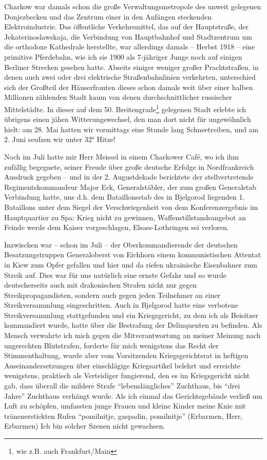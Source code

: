 Charkow war damals schon die große Verwaltungsmetropole des unweit gelegenen Donjezbecken und das Zentrum einer in den Anfängen steckenden Elektroindustrie. Das öffentliche Verkehrsmittel, das auf der Hauptstraße, der Jekaterinoslawskaja, die Verbindung von Hauptbahnhof und Stadtzentrum um die orthodoxe Kathedrale herstellte, war allerdings damals -- Herbst 1918 -- eine primitive Pferdebahn, wie ich sie 1900 als 7-jähriger Junge noch auf einigen Berliner Strecken gesehen hatte. Abseits einiger weniger großer Prachtstraßen, in denen auch zwei oder drei elektrische Straßenbahnlinien verkehrten, unterschied sich der Großteil der Häuserfronten dieses schon damals weit über einer halben Millionen zählenden Stadt kaum von denen durchschnittlicher russischer Mittelstädte. In dieser auf dem 50. Breitengrade\footnote{wie z.B. auch Frankfurt/Main} gelegenen Stadt erlebte ich übrigens einen jähen Witterungswechsel, den man dort nicht für ungewöhnlich hielt: am 28. Mai hatten wir vormittags eine Stunde lang Schneetreiben, und am 2. Juni seufzen wir unter 32° Hitze!

Noch im Juli hatte mir Herr Meissel in einem Charkower Café, wo ich ihm zufällig begegnete, seiner Freude über große deutsche Erfolge in Nordfrankreich Ausdruck gegeben -- und in der 2. Augustdekade berichtete der stellvertretende Regimentskommandeur Major Eck, Generalstäbler, der zum großen Generalstab Verbindung hatte, uns d.h. dem Bataillonsstab des in Bjelgorod liegenden 1. Bataillons unter dem Siegel der Verschwiegenheit von dem Konferenzergebnis im Hauptquartier zu Spa: Krieg nicht zu gewinnen, Waffenstillstandsangebot an Feinde werde dem Kaiser vorgeschlagen, Elsass-Lothringen sei verloren.

Inzwischen war -- schon im Juli -- der Oberkommandierende der deutschen Besatzungstruppen Generaloberst von Eichhorn einem kommunistischen Attentat in Kiew zum Opfer gefallen und hier und da riefen ukrainische Eisenbahner zum Streik auf. Dies war für uns natürlich eine ernste Gefahr und so wurde deutscherseits auch mit drakonischen Strafen nicht nur gegen Streikpropagandisten, sondern auch gegen jeden Teilnehmer an einer Streikversammlung eingeschritten. Auch in Bjelgorod hatte eine verbotene Streikversammlung stattgefunden und ein Kriegsgericht, zu dem ich als Beisitzer kommandiert wurde, hatte über die Bestrafung der Delinquenten zu befinden. Als Mensch verwahrte ich mich gegen die Mitverantwortung an meiner Meinung nach ungerechten Blutstrafen, forderte für mich wenigstens das Recht der Stimmenthaltung, wurde aber vom Vorsitzenden Kriegsgerichtsrat in heftigen Auseinandersetzungen über einschlägige Kriegsartikel belehrt und erreichte wenigstens, praktisch als Verteidiger fungierend, den es im Kriegsgericht nicht gab, dass überall die mildere Strafe \enquote{lebenslängliches} Zuchthaus, bis \enquote{drei Jahre} Zuchthaus verhängt wurde. Als ich einmal das Gerichtsgebäude verließ um Luft zu schöpfen, umfassten junge Frauen und kleine Kinder meine Knie mit tränenerstickten Rufen \enquote{pomilnitje, gaspadin, pomilnitje} (Erbarmen, Herr, Erbarmen) Ich bin solcher Szenen nicht gewachsen.


